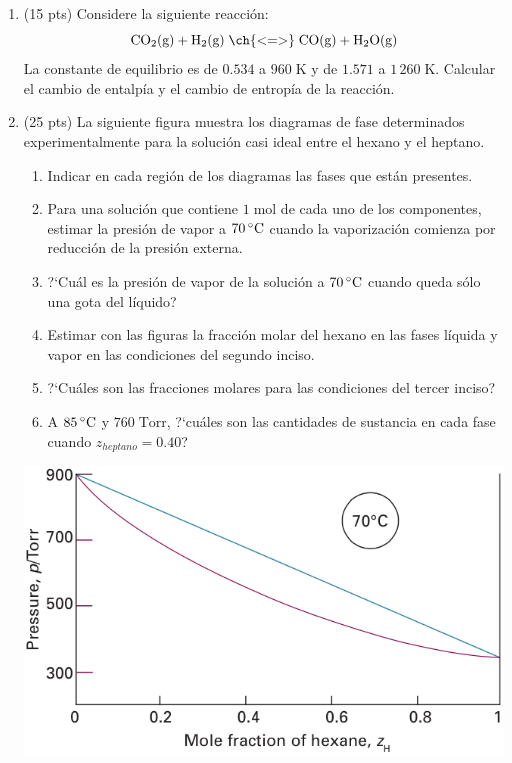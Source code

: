 \documentclass[a4paper,12pt]{article}
\begin{document}
\begin{enumerate}
 \item (15 pts) Considere la siguiente reacci\'on:
$$\mbox{CO}_2\mbox{(g)}+\mbox{H}_2\mbox{(g)}\;\ch{ <=> }\;\mbox{CO(g)}+\mbox{H}_2\mbox{O(g)}$$
La constante de equilibrio es de $0.534$ a $960\;\mbox{K}$ y de $1.571$ a $1\,260\;\mbox{K}$. Calcular el cambio de entalp\'ia y el cambio de entrop\'ia de la reacci\'on. %

 \item (25 pts) La siguiente figura muestra los diagramas de fase determinados experimentalmente para la soluci\'on casi ideal entre el hexano y el heptano.
\begin{enumerate}
 \item Indicar en cada regi\'on de los diagramas las fases que est\'an presentes.
 \item Para una soluci\'on que contiene $1\;\mbox{mol}$ de cada uno de los componentes, estimar la presi\'on de vapor a $70\,\celsius$ cuando la vaporizaci\'on comienza por reducci\'on de la presi\'on externa.
 \item ?`Cu\'al es la presi\'on de vapor de la soluci\'on a $70\,\celsius$ cuando queda s\'olo una gota del l\'iquido?
 \item Estimar con las figuras la fracci\'on molar del hexano en las fases l\'iquida y vapor en las condiciones del segundo inciso.
 \item ?`Cu\'ales son las fracciones molares para las condiciones del tercer inciso?
 \item A $85\,\celsius$ y $760\;\mbox{Torr}$, ?`cu\'ales son las cantidades de sustancia en cada fase cuando $z_{heptano}=0.40$?
\end{enumerate}

\begin{center}
 \includegraphics[scale=0.46]{figure2}
\end{center}


\end{enumerate}
\end{document}
